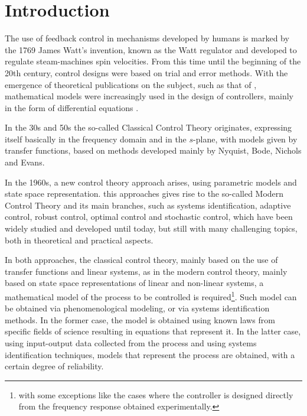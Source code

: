 
\chapter{Introduction}
\label{cap1} \vspace{-1cm}

%
The use of feedback control in mechanisms developed by humans is marked by the 1769 James Watt's invention, known as the Watt regulator and developed to regulate steam-machines spin velocities.
From this time until the beginning of the 20th century, control designs were based on trial and error methods. With the emergence of theoretical publications on the subject, such as that of \citep{tolle1921}, mathematical models were increasingly used in the design of controllers, mainly in the form of differential equations \citep{takahashi1972}.

In the 30s and 50s the so-called Classical Control Theory originates, expressing itself basically in the frequency domain and in the $s$-plane, with models given by transfer functions, based on methods developed mainly by Nyquist, Bode, Nichols and Evans.

In the 1960s, a new control theory approach arises, using parametric models and state space representation. this approaches gives rise to the so-called Modern Control Theory and its main branches, such as systems identification, adaptive control, robust control, optimal control and stochastic control, which have been widely studied and developed until today, but still with many challenging topics, both in theoretical and practical aspects. %

In both approaches, the classical control theory, mainly based on the use of transfer functions and linear systems, as in the modern control theory, mainly based on state space representations of linear and non-linear systems, a mathematical model of the process to be controlled is required\footnote{with some exceptions like the cases where the controller is designed directly from the frequency response obtained experimentally.}.
Such model can be obtained via phenomenological modeling, or via systems identification methods. In the former case, the model is obtained using known laws from specific fields of science resulting in equations that represent it. In the latter case, using input-output data collected from the process and using systems identification techniques, models that represent the process are obtained, with a certain degree of reliability.

